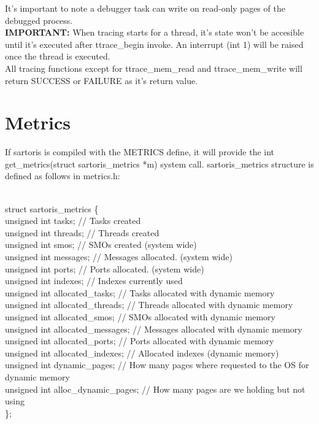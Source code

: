 \documentclass[11pt, letterpaper, twoside, english]{book}
\begin{document}
It's important to note a debugger task can write on read-only pages of the debugged process.\\

\textbf{IMPORTANT:} When tracing starts for a thread, it's state won't be accesible until it's executed after \textsf{ttrace\_begin} invoke. An interrupt (int 1) will be raised once the thread is executed.\\

All tracing functions except for \textsf{ttrace\_mem\_read} and \textsf{ttrace\_mem\_write} will return SUCCESS or FAILURE as it's return value.

\section{Metrics} \label{sec:metrics}

If sartoris is compiled with the METRICS define, it will provide the \textsf{int get\_metrics(struct sartoris\_metrics *m)} system call. \textsf{sartoris\_metrics} structure is defined as follows in \textsf{metrics.h}:\\
\\
\begin{sf} \noindent struct sartoris\_metrics \{ \\
\indent unsigned int tasks;                 // Tasks created\\
\indent unsigned int threads;               // Threads created\\
\indent unsigned int smos;									// SMOs created (system wide)\\
\indent unsigned int messages;							// Messages allocated. (system wide)\\
\indent unsigned int ports;									// Ports allocated. (system wide)\\
\indent unsigned int indexes;               // Indexes currently used\\
\indent unsigned int allocated\_tasks;       // Tasks allocated with dynamic memory\\
\indent unsigned int allocated\_threads;     // Threads allocated with dynamic memory\\
\indent unsigned int allocated\_smos;        // SMOs allocated with dynamic memory\\
\indent unsigned int allocated\_messages;    // Messages allocated with dynamic memory\\
\indent unsigned int allocated\_ports;       // Ports allocated with dynamic memory\\
\indent unsigned int allocated\_indexes;     // Allocated indexes (dynamic memory)\\
\indent unsigned int dynamic\_pages;         // How many pages where requested to the OS for dynamic memory\\
\indent unsigned int alloc\_dynamic\_pages;   // How many pages are we holding but not using\\\}; \\
\end{sf}
\\
\end{document}
